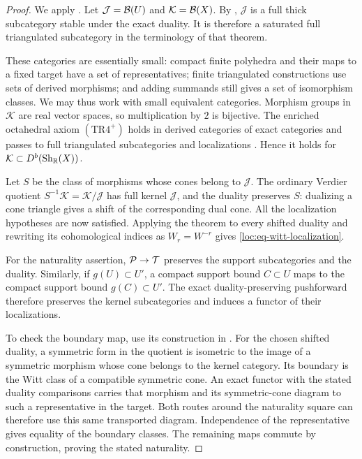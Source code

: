 \begin{proof}
We apply \cite[Theorem~2.1, pp.~132--134]{BalmerWalter2002}.
Let $\mathcal J=\mathcal B(U)$ and $\mathcal K=\mathcal B(X)$.
By , $\mathcal J$ is a full thick
subcategory stable under the exact duality.  It is therefore a
saturated full triangulated subcategory in the terminology of that
theorem.

These categories are essentially small: compact finite polyhedra and
their maps to a fixed target have a set of representatives; finite
triangulated constructions use sets of derived morphisms; and adding
summands still gives a set of isomorphism classes.  We may thus work
with small equivalent categories.  Morphism groups in $\mathcal K$
are real vector spaces, so multiplication by $2$ is bijective.
The enriched
octahedral axiom $(\mathrm{TR4}^{+})$ holds in derived categories of
exact categories and passes to full triangulated subcategories and
localizations \cite[\S2, p.~133]{BalmerWalter2002}.  Hence it holds
for $\mathcal K\subset D^b(\operatorname{Sh}_{\mathbb R}(X))$.

Let $S$ be the class of morphisms whose cones belong to $\mathcal J$.
The ordinary Verdier quotient
$S^{-1}\mathcal K=\mathcal K/\mathcal J$ has full kernel
$\mathcal J$, and the duality preserves $S$: dualizing a cone
triangle gives a shift of the corresponding dual cone.  All the
localization hypotheses are now satisfied.  Applying the theorem
to every shifted duality and rewriting its cohomological indices as
$W_r=W^{-r}$ gives
\eqref{loc:eq-witt-localization}.

For the naturality assertion, $\mathcal P\to\mathcal T$ preserves the support
subcategories and the duality.  Similarly, if $g(U)\subset U'$, a
compact support bound $C\subset U$ maps to the compact support bound
$g(C)\subset U'$.  The exact duality-preserving pushforward therefore
preserves the kernel subcategories and induces a functor of their
localizations.

To check the boundary map, use its construction in
\cite[\S2, p.~133]{BalmerWalter2002}.  For the chosen shifted duality,
a symmetric form in the quotient is isometric to the image of a
symmetric morphism whose cone belongs to the kernel category.
Its boundary is the Witt class of a compatible symmetric cone.
An exact functor with the stated duality comparisons carries that
morphism and its symmetric-cone diagram to such a representative
in the target.  Both routes around the naturality square can
therefore use this same transported diagram.  Independence of the
representative gives equality of the boundary classes.  The remaining
maps commute by construction, proving the stated naturality.
\end{proof}

